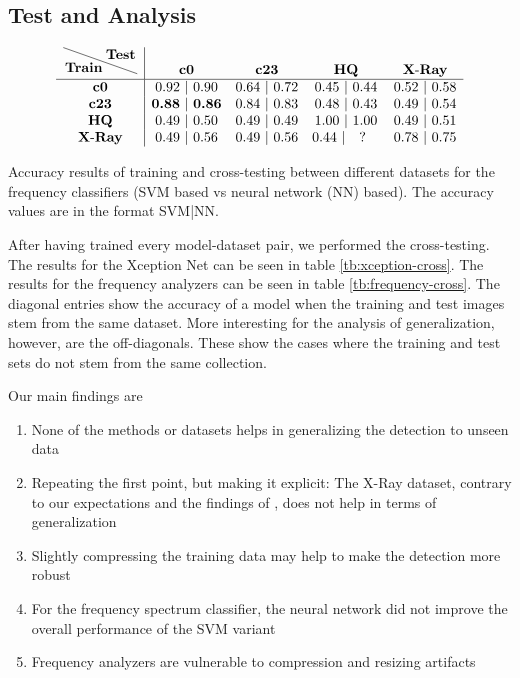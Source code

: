 \documentclass[11pt]{article}
\begin{document}
\subsection{Test and Analysis}
\begin{table}[!t]
\[\begin{array}{c|cccc}
\tikz{\node[below left, inner sep=1pt] (def) {\textbf{Train}};%
      \node[above right,inner sep=1pt] (abc) {\textbf{Test}};%
      \draw (def.north west|-abc.north west) -- (def.south east-|abc.south east);}
 & \textbf{c0} & \textbf{c23} & \textbf{HQ} & \textbf{X\textnormal{-}Ray}\\
\hline
\textbf{c0} & 0.92 \ | \ 0.90 & 0.64 \ | \ 0.72 & 0.45\ | \ 0.44 & 0.52\ | \ 0.58\\
\textbf{c23} & \textbf{0.88}\ | \ \textbf{0.86} & 0.84\ | \ 0.83 & 0.48\ | \ 0.43 & 0.49\ | \ 0.54\\
\textbf{HQ} & 0.49\ | \ 0.50 & 0.49\ | \ 0.49 & 1.00\ | \ 1.00 & 0.49\ | \ 0.51\\
\textbf{X\textnormal{-}Ray} & 0.49\ | \ 0.56 & 0.49\ | \ 0.56 & 0.44\ | \ \ \ ? \ \ \ & 0.78\ | \ 0.75\\
\end{array}\]
\caption{\label{tb:frequency-cross}
 Accuracy results of training and cross-testing between different datasets for the frequency classifiers (SVM based vs neural network (NN) based). The accuracy values are in the format SVM|NN.
}
\end{table}
After having trained every model-dataset pair, we performed the cross-testing. The results for the Xception Net can be seen in table \ref{tb:xception-cross}. The results for the frequency analyzers can be seen in table \ref{tb:frequency-cross}. The diagonal entries show the accuracy of a model when the training and test images stem from the same dataset. More interesting for the analysis of generalization, however, are the off-diagonals. These show the cases where the training and test sets do not stem from the same collection.

Our main findings are
\begin{enumerate}
    \item None of the methods or datasets helps in generalizing the detection to unseen data
    \item Repeating the first point, but making it explicit: The X-Ray dataset, contrary to our expectations and the findings of \cite{li2020face}, does not help in terms of generalization
    \item Slightly compressing the training data may help to make the detection more robust
    \item For the frequency spectrum classifier, the neural network did not improve the overall performance of the SVM variant
    \item Frequency analyzers are vulnerable to compression and resizing artifacts
\end{enumerate}
\end{document}
